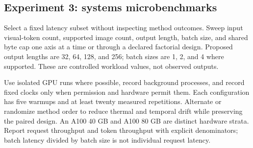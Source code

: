 \subsection{Experiment 3: systems microbenchmarks}
Select a fixed latency subset without inspecting method outcomes. Sweep input
visual-token count, supported image count, output length, batch size, and shared
byte cap one axis at a time or through a declared factorial design. Proposed
output lengths are 32, 64, 128, and 256; batch sizes are 1, 2, and 4 where
supported. These are controlled workload values, not observed outputs.

Use isolated GPU runs where possible, record background processes, and record
fixed clocks only when permission and hardware permit them. Each configuration
has five warmups and at least twenty measured repetitions. Alternate or
randomize method order to reduce thermal and temporal drift while preserving
the paired design. An A100 40 GB and A100 80 GB are distinct hardware strata.
Report request throughput and token throughput with explicit denominators;
batch latency divided by batch size is not individual request latency.


